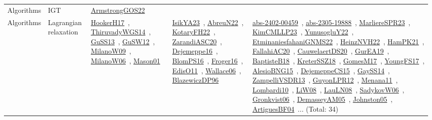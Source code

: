 {\begin{longtable}{lp{3cm}>{\raggedright\arraybackslash}p{6cm}>{\raggedright\arraybackslash}p{6cm}>{\raggedright\arraybackslash}p{8cm}}
\index{IGT}\index{Algorithms!IGT}Algorithms & IGT & \href{../works/ArmstrongGOS22.pdf}{ArmstrongGOS22}~\cite{ArmstrongGOS22} &  & \\
\index{Lagrangian relaxation}\index{Algorithms!Lagrangian relaxation}Algorithms & Lagrangian relaxation & \href{../works/HookerH17.pdf}{HookerH17}~\cite{HookerH17}, \href{../works/ThiruvadyWGS14.pdf}{ThiruvadyWGS14}~\cite{ThiruvadyWGS14}, \href{../works/GuSS13.pdf}{GuSS13}~\cite{GuSS13}, \href{../works/GuSW12.pdf}{GuSW12}~\cite{GuSW12}, \href{../works/MilanoW09.pdf}{MilanoW09}~\cite{MilanoW09}, \href{../works/MilanoW06.pdf}{MilanoW06}~\cite{MilanoW06}, \href{../works/Mason01.pdf}{Mason01}~\cite{Mason01} & \href{../works/IsikYA23.pdf}{IsikYA23}~\cite{IsikYA23}, \href{../works/AbreuN22.pdf}{AbreuN22}~\cite{AbreuN22}, \href{../works/KotaryFH22.pdf}{KotaryFH22}~\cite{KotaryFH22}, \href{../works/ZarandiASC20.pdf}{ZarandiASC20}~\cite{ZarandiASC20}, \href{../works/Dejemeppe16.pdf}{Dejemeppe16}~\cite{Dejemeppe16}, \href{../works/BlomPS16.pdf}{BlomPS16}~\cite{BlomPS16}, \href{../works/Froger16.pdf}{Froger16}~\cite{Froger16}, \href{../works/EdisO11.pdf}{EdisO11}~\cite{EdisO11}, \href{../works/Wallace06.pdf}{Wallace06}~\cite{Wallace06}, \href{../works/BlazewiczDP96.pdf}{BlazewiczDP96}~\cite{BlazewiczDP96} & \href{../works/abs-2402-00459.pdf}{abs-2402-00459}~\cite{abs-2402-00459}, \href{../works/abs-2305-19888.pdf}{abs-2305-19888}~\cite{abs-2305-19888}, \href{../works/MarliereSPR23.pdf}{MarliereSPR23}~\cite{MarliereSPR23}, \href{../works/KimCMLLP23.pdf}{KimCMLLP23}~\cite{KimCMLLP23}, \href{../works/YunusogluY22.pdf}{YunusogluY22}~\cite{YunusogluY22}, \href{../works/EtminaniesfahaniGNMS22.pdf}{EtminaniesfahaniGNMS22}~\cite{EtminaniesfahaniGNMS22}, \href{../works/HeinzNVH22.pdf}{HeinzNVH22}~\cite{HeinzNVH22}, \href{../works/HamPK21.pdf}{HamPK21}~\cite{HamPK21}, \href{../works/FallahiAC20.pdf}{FallahiAC20}~\cite{FallahiAC20}, \href{../works/CauwelaertDS20.pdf}{CauwelaertDS20}~\cite{CauwelaertDS20}, \href{../works/GurEA19.pdf}{GurEA19}~\cite{GurEA19}, \href{../works/BaptisteB18.pdf}{BaptisteB18}~\cite{BaptisteB18}, \href{../works/KreterSSZ18.pdf}{KreterSSZ18}~\cite{KreterSSZ18}, \href{../works/GomesM17.pdf}{GomesM17}~\cite{GomesM17}, \href{../works/YoungFS17.pdf}{YoungFS17}~\cite{YoungFS17}, \href{../works/AlesioBNG15.pdf}{AlesioBNG15}~\cite{AlesioBNG15}, \href{../works/DejemeppeCS15.pdf}{DejemeppeCS15}~\cite{DejemeppeCS15}, \href{../works/GaySS14.pdf}{GaySS14}~\cite{GaySS14}, \href{../works/ZampelliVSDR13.pdf}{ZampelliVSDR13}~\cite{ZampelliVSDR13}, \href{../works/GuyonLPR12.pdf}{GuyonLPR12}~\cite{GuyonLPR12}, \href{../works/Menana11.pdf}{Menana11}~\cite{Menana11}, \href{../works/Lombardi10.pdf}{Lombardi10}~\cite{Lombardi10}, \href{../works/LiW08.pdf}{LiW08}~\cite{LiW08}, \href{../works/LauLN08.pdf}{LauLN08}~\cite{LauLN08}, \href{../works/SadykovW06.pdf}{SadykovW06}~\cite{SadykovW06}, \href{../works/Gronkvist06.pdf}{Gronkvist06}~\cite{Gronkvist06}, \href{../works/DemasseyAM05.pdf}{DemasseyAM05}~\cite{DemasseyAM05}, \href{../works/Johnston05.pdf}{Johnston05}~\cite{Johnston05}, \href{../works/ArtiguesBF04.pdf}{ArtiguesBF04}~\cite{ArtiguesBF04}... (Total: 34)\\

\end{longtable}}
